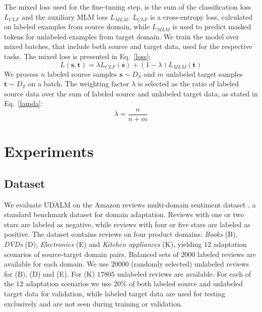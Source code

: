 \documentclass[11pt]{article}
\begin{document}
The mixed loss used for the fine-tuning step, is the sum of the classification loss \(L_{CLF}\) and the auxiliary MLM loss \(L_{MLM}\). 
\(L_{CLF}\) is a cross-entropy loss, calculated on labeled examples from source domain, while \(L_{MLM}\) is used to predict masked tokens for unlabeled examples from target domain.
We train the model over mixed batches, that include both source and target data, used for the respective tasks. 
The mixed loss is presented in Eq.~\ref{loss}:
\begin{equation}
\label{loss}
    L(\textbf{s},\textbf{t}) = \lambda L_{CLF}(\textbf{s}) + (1-\lambda) L_{MLM}(\textbf{t})
\end{equation}
We process \(n\) labeled source samples \(\textbf{s} \sim D_S\) and \(m\) unlabeled target samples \(\textbf{t} \sim D_T\) on a batch. The weighting factor  \(\lambda\) is selected as the ratio of labeled source data over the sum of labeled source and unlabeled target data, as stated in Eq.~\ref{lamda}:
\begin{equation}
\label{lamda}
    \lambda = \frac{n}{n+m} 
\end{equation}

\section{Experiments}
\subsection{Dataset}

We evaluate UDALM on the Amazon reviews multi-domain sentiment dataset \citep{blitzer-etal-2007-biographies}, a standard benchmark dataset for domain adaptation. Reviews with one or two stars are labeled as negative, while reviews with four or five stars are labeled as positive. 
The dataset contains reviews on four product domains: \textit{Books} (B), \textit{DVDs} (D), \textit{Electronics} (E) and \textit{Kitchen appliances} (K), yielding $12$ adaptation scenarios of source-target domain pairs. 
Balanced sets of $2000$ labeled reviews are available for each domain.
We use $20000$ (randomly selected) unlabeled reviews for (B), (D) and (E). For (K) $17805$ unlabeled reviews are available.
For each of the $12$ adaptation scenarios we use  $20\%$ of both labeled source and unlabeled target data for validation, while labeled target data are used for testing exclusively and are not seen during training or validation. 
\end{document}
